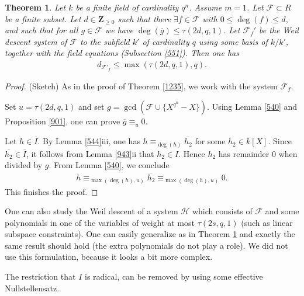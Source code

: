 \documentclass{amsart}
\theoremstyle{plain}
\newtheorem{theorem}{Theorem}[section]
\theoremstyle{definition}
\begin{document}
\begin{theorem} \label{8056}
Let $k$ be a finite field of cardinality $q^n$. Assume $m=1$. Let $\mathcal{F} \subset R$ be a finite subset. Let $d \in {\mathbf{Z}}_{\geq 0}$ such that there $\exists f \in \mathcal{F}$ with $0 \leq \deg(f) \leq d$, and such that for all $g \in \mathcal{F}$ we have $\deg(\overline{g}) \leq \tau(2d,q,1)$. Let $\mathcal{F}_f'$ be the Weil descent system of $\mathcal{F}$ to the subfield $k'$ of cardinality $q$ using some basis of $k/k'$, together with the field equations (Subsection \ref{551}). Then one has
\begin{eqnarray*}
d_{\mathcal{F}'_f} \leq \max(\tau(2d,q,1), q).
\end{eqnarray*}
\end{theorem}
\begin{proof}
(Sketch) As in the proof of Theorem \ref{1235}, we work with the system $\overline{\mathcal{F}}_f$.

Set $u=\tau(2d,q,1)$ and set $g=\gcd(\mathcal{F} \cup \{X^{q^n}-X\})$. Using Lemma \ref{540} and Proposition \ref{901}, one can prove $\overline{g} \equiv_{u} 0$.

Let $h \in \overline{I}$. By Lemma \ref{544}iii, one has $h \equiv_{\deg(h)} \overline{h_2}$ for some $h_2 \in k[X]$. Since $\overline{h_2} \in \overline{I}$, it follows from Lemma \ref{943}ii that $h_2 \in I$. Hence $h_2$ has remainder $0$ when divided by $g$. From Lemma \ref{540}, we conclude
\begin{eqnarray*}
h \equiv_{\max(\deg(h), u)} \overline{h_2} \equiv_{\max(\deg(h), u)} 0.
\end{eqnarray*}
This finishes the proof.
\end{proof}

One can also study the Weil descent of a system $\mathcal{H}$ which consists of $\mathcal{F}$ and some polynomials in one of the variables of weight at most $\tau(2s,q,1)$ (such as linear subspace constraints). One can easily generalize as in Theorem \ref{8056} and exactly the same result should hold (the extra polynomials do not play a role). We did not use this formulation, because it looks a bit more complex.

The restriction that $I$ is radical, can be removed by using some effective Nullstellensatz.
\end{document}

